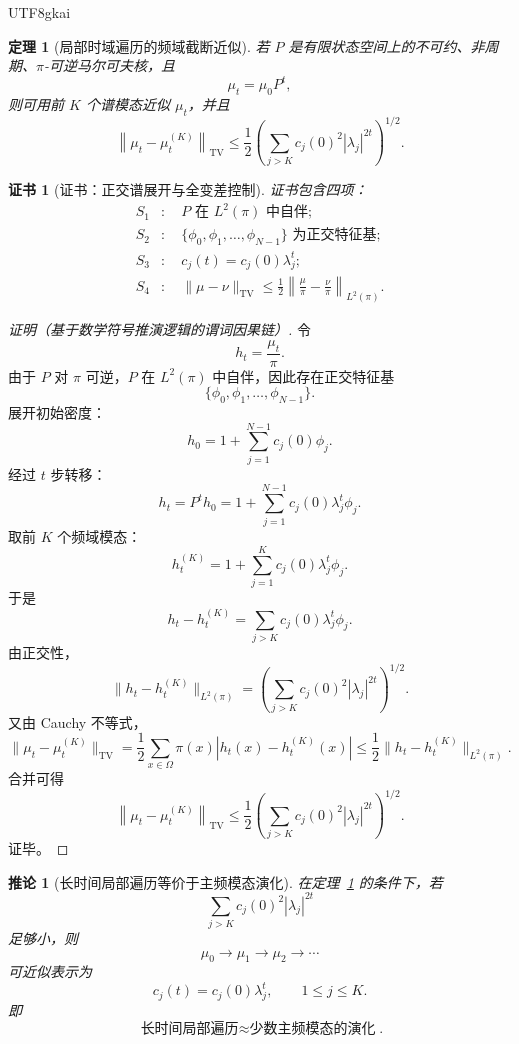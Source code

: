 \documentclass[12pt]{article}
\newtheorem{theorem}{定理}[section]
\newtheorem{corollary}{推论}[section]
\newtheorem{Certificate}{证书}[section]
\newcommand{\TV}{\mathrm{TV}}
\begin{document}
\begin{CJK*}{UTF8}{gkai}
\begin{theorem}[局部时域遍历的频域截断近似]
\label{thm:tex55-spectral-truncation}
若 \(P\) 是有限状态空间上的不可约、非周期、\(\pi\)-可逆马尔可夫核，且
\[
  \mu_t=\mu_0P^t,
\]
则可用前 \(K\) 个谱模态近似 \(\mu_t\)，并且
\[
  \left\|
  \mu_t-\mu_t^{(K)}
  \right\|_{\TV}
  \le
  \frac12
  \left(
  \sum_{j>K}c_j(0)^2|\lambda_j|^{2t}
  \right)^{1/2}.
\]
\end{theorem}

\begin{Certificate}[证书：正交谱展开与全变差控制]
\label{cert:tex55-spectral-truncation}
证书包含四项：
\[
\begin{aligned}
  S_1&:\quad P\text{ 在 }L^2(\pi)\text{ 中自伴};\\
  S_2&:\quad \{\phi_0,\phi_1,\ldots,\phi_{N-1}\}\text{ 为正交特征基};\\
  S_3&:\quad c_j(t)=c_j(0)\lambda_j^t;\\
  S_4&:\quad
  \|\mu-\nu\|_{\TV}
  \le \frac12
  \left\|\frac{\mu}{\pi}-\frac{\nu}{\pi}\right\|_{L^2(\pi)}.
\end{aligned}
\]
\end{Certificate}

\begin{proof}[证明（基于数学符号推演逻辑的谓词因果链）]
令
\[
  h_t=\frac{\mu_t}{\pi}.
\]
由于 \(P\) 对 \(\pi\) 可逆，\(P\) 在 \(L^2(\pi)\) 中自伴，因此存在正交特征基
\[
  \{\phi_0,\phi_1,\ldots,\phi_{N-1}\}.
\]
展开初始密度：
\[
  h_0
  =
  1+\sum_{j=1}^{N-1}c_j(0)\phi_j.
\]
经过 \(t\) 步转移：
\[
  h_t
  =
  P^th_0
  =
  1+\sum_{j=1}^{N-1}c_j(0)\lambda_j^t\phi_j.
\]
取前 \(K\) 个频域模态：
\[
  h_t^{(K)}
  =
  1+\sum_{j=1}^{K}c_j(0)\lambda_j^t\phi_j.
\]
于是
\[
  h_t-h_t^{(K)}
  =
  \sum_{j>K}c_j(0)\lambda_j^t\phi_j.
\]
由正交性，
\[
  \|h_t-h_t^{(K)}\|_{L^2(\pi)}
  =
  \left(
  \sum_{j>K}c_j(0)^2|\lambda_j|^{2t}
  \right)^{1/2}.
\]
又由 Cauchy 不等式，
\[
  \|\mu_t-\mu_t^{(K)}\|_{\TV}
  =
  \frac12\sum_{x\in\Omega}\pi(x)|h_t(x)-h_t^{(K)}(x)|
  \le
  \frac12\|h_t-h_t^{(K)}\|_{L^2(\pi)}.
\]
合并可得
\[
  \left\|
  \mu_t-\mu_t^{(K)}
  \right\|_{\TV}
  \le
  \frac12
  \left(
  \sum_{j>K}c_j(0)^2|\lambda_j|^{2t}
  \right)^{1/2}.
\]
证毕。
\end{proof}

\begin{corollary}[长时间局部遍历等价于主频模态演化]
\label{cor:tex55-time-to-frequency}
在定理~\ref{thm:tex55-spectral-truncation} 的条件下，若
\[
  \sum_{j>K}c_j(0)^2|\lambda_j|^{2t}
\]
足够小，则
\[
  \mu_0\to\mu_1\to\mu_2\to\cdots
\]
可近似表示为
\[
  c_j(t)=c_j(0)\lambda_j^t,
  \qquad
  1\le j\le K.
\]
即
\[
  \boxed{
  \text{长时间局部遍历}
  \approx
  \text{少数主频模态的演化}
  }.
\]
\end{corollary}


\end{CJK*}
\end{document}

